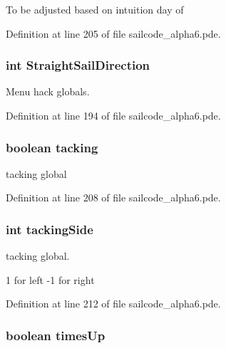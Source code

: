 \-To be adjusted based on intuition day of 

\-Definition at line 205 of file sailcode\-\_\-alpha6.\-pde.

\hypertarget{group__group1_gac9d865c1411ae815f6b2394c45d604e7}{
\subsubsection[{\-Straight\-Sail\-Direction}]{\setlength{\rightskip}{0pt plus 5cm}int {\bf \-Straight\-Sail\-Direction}}}
\label{group__group1_gac9d865c1411ae815f6b2394c45d604e7}


\-Menu hack globals. 



\-Definition at line 194 of file sailcode\-\_\-alpha6.\-pde.

\hypertarget{group__group1_gab23a7a79ede8d141fa92f4475d36fb24}{
\subsubsection[{tacking}]{\setlength{\rightskip}{0pt plus 5cm}boolean {\bf tacking}}}
\label{group__group1_gab23a7a79ede8d141fa92f4475d36fb24}


tacking global 



\-Definition at line 208 of file sailcode\-\_\-alpha6.\-pde.

\hypertarget{group__group1_gabdfa4a25e22806c47eebd4c9826ef7a6}{
\subsubsection[{tacking\-Side}]{\setlength{\rightskip}{0pt plus 5cm}int {\bf tacking\-Side}}}
\label{group__group1_gabdfa4a25e22806c47eebd4c9826ef7a6}


tacking global. 

1 for left -\/1 for right 

\-Definition at line 212 of file sailcode\-\_\-alpha6.\-pde.

\hypertarget{group__group1_gaf453f5fa6c0df67707ca308a2fc80ca1}{
\subsubsection[{times\-Up}]{\setlength{\rightskip}{0pt plus 5cm}boolean {\bf times\-Up}}}
\label{group__group1_gaf453f5fa6c0df67707ca308a2fc80ca1}


